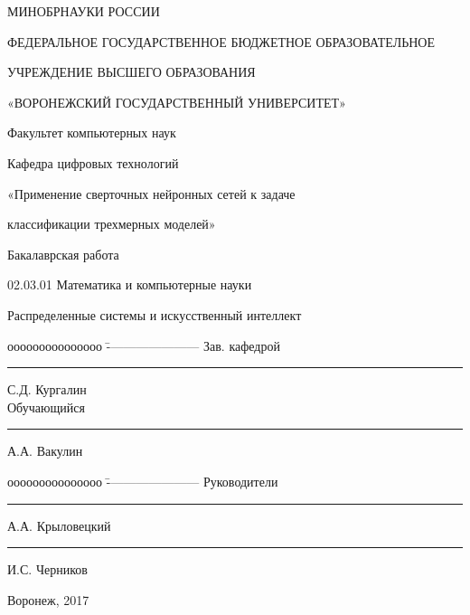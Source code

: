 \documentclass[14pt]{article}
\numberwithin{figure}{section}
\numberwithin{equation}{section}
\begin{document}
\begin{titlepage}

\thispagestyle{empty}

\centerline{МИНОБРНАУКИ РОССИИ}
\centerline{ФЕДЕРАЛЬНОЕ ГОСУДАРСТВЕННОЕ БЮДЖЕТНОЕ ОБРАЗОВАТЕЛЬНОЕ}
\centerline{УЧРЕЖДЕНИЕ ВЫСШЕГО ОБРАЗОВАНИЯ}
\centerline{«ВОРОНЕЖСКИЙ ГОСУДАРСТВЕННЫЙ УНИВЕРСИТЕТ»}

\vspace{0.3cm}

\centerline{Факультет компьютерных наук}
\centerline{Кафедра цифровых технологий}

\vspace{1cm}

\centerline{«Применение сверточных нейронных сетей к задаче }
\centerline{классификации трехмерных моделей»}

\vspace{1cm}

\centerline{Бакалаврская работа}
\centerline{02.03.01 Математика и компьютерные науки}
\centerline{Распределенные системы и искусственный интеллект}

\vfill

\begin{tabbing}
ооооооооооооооо	\=	----------------------	\kill
Зав. кафедрой	\> 	\rule[0mm]{7cm}{0,3mm}	С.Д. Кургалин \\
Обучающийся 	\> 	\rule[0mm]{7cm}{0,3mm}	А.А. Вакулин
\end{tabbing}

\begin{tabbing}
ооооооооооооооо	\=	----------------------	\kill
Руководители	\> 	\rule[0mm]{7cm}{0,3mm}  А.А. Крыловецкий \\
				\> 	\rule[0mm]{7cm}{0,3mm}  И.С. Черников
\end{tabbing}

\vfill

\centerline{Воронеж, 2017}
\clearpage
\end{titlepage}



\newpage

\pagestyle{plain} %
\setcounter{page}{2} %
\tableofcontents
\end{document}
